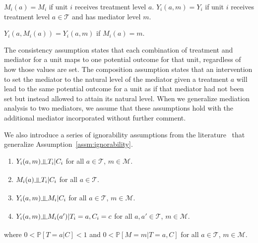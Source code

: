\begin{assumption}[Consistency]\label{assm:consistency}
$M_{i}(a) = M_{i}$ if unit $i$ receives treatment level $a$. 
$Y_{i}(a,m) = Y_{i}$ if unit $i$ receives treatment level $a \in \mathcal{T}$ and 
has mediator level $m$. 
\end{assumption}

\begin{assumption}[Composition]\label{assm:composition}
$Y_{i}(a,M_{i}(a)) = Y_{i}(a,m)$ if $M_{i}(a) = m$. 
\end{assumption}

The consistency assumption
states that each combination of treatment and mediator for a unit maps to one potential outcome for that unit, 
regardless of how those values are set. The composition assumption states that an intervention to set the mediator to the 
natural level of the mediator given a treatment $a$ will lead to the same potential outcome for a unit as if that 
mediator had not been set but instead allowed to attain its natural level. When we generalize mediation analysis to
two mediators, we assume that these assumptions hold with the additional mediator incorporated without further comment. 

We also introduce a series of ignorability assumptions from the literature~\cite{pearl2001,imaietal2010a} that generalize
Assumption~\ref{assm:ignorability}.

\begin{assumption}\label{assm:seq_ignorability} 
\indent
\begin{enumerate}[noitemsep,topsep=0pt,label=(\roman*)]
	\item $Y_{i}(a,m) \indep T_{i} | C_{i}$ for all $a \in \mathcal{T}$, $m \in \mathcal{M}$. 
	\item $M_{i}(a) \indep T_{i} | C_{i}$ for all $a \in \mathcal{T}$. 
	\item $Y_{i}(a,m) \indep M_{i} | C_{i}$ for all $a \in \mathcal{T}$, $m \in \mathcal{M}$. 
	\item $Y_{i}(a,m) \indep M_{i}(a') | T_{i} = a, C_{i} = c$ for all $a,a' \in \mathcal{T}$, $m \in \mathcal{M}$. 
\end{enumerate}
where $0 < \mathbb{P}[T = a | C] < 1$ and $0 < \mathbb{P}[M = m | T = a, C]$
 for all $a \in \mathcal{T}$, $m \in \mathcal{M}$. 
\end{assumption}

